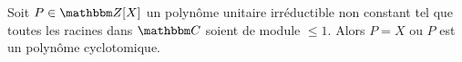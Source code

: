 %
%

\begin{theorem} \label{ThojCJpFW}
    Soit \( P\in \eZ[X]\) un polynôme unitaire irréductible non constant tel que toutes les racines dans \( \eC\) soient de module \( \leq 1\). Alors \( P=X\) ou \( P\) est un polynôme cyclotomique.
\end{theorem}

